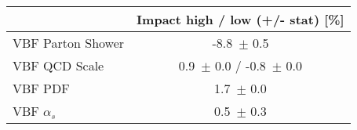 \begin{tabular}{ | l || c |}
\hline
 & Impact high / low (+/- stat) [\%]  \tabularnewline
\hline
VBF Parton Shower& -8.8\, $\pm$  0.5\tabularnewline
VBF QCD Scale & 0.9\, $\pm$ 0.0 / -0.8\, $\pm$ 0.0 \tabularnewline
VBF PDF & 1.7\, $\pm$  0.0 \tabularnewline
VBF $\alpha_s$ & 0.5\, $\pm$  0.3 \tabularnewline
\hline
\end{tabular}


